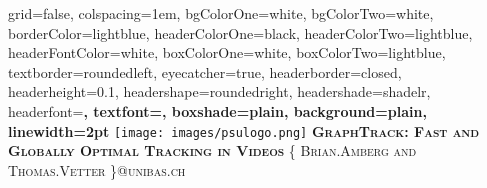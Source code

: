\documentclass[landscape,final,a0paper,fontscale=0.285]{baposter}
\begin{document}



\begin{poster}%
  {
  grid=false,
  colspacing=1em,
  bgColorOne=white,
  bgColorTwo=white,
  borderColor=lightblue,
  headerColorOne=black,
  headerColorTwo=lightblue,
  headerFontColor=white,
  boxColorOne=white,
  boxColorTwo=lightblue,
  textborder=roundedleft,
  eyecatcher=true,
  headerborder=closed,
  headerheight=0.1\textheight,
  headershape=roundedright,
  headershade=shadelr,
  headerfont=\Large\bf\textsc, %
  textfont={\setlength{\parindent}{1.5em}},
  boxshade=plain,
  background=plain,
  linewidth=2pt
  }
  {\texttt{[image: images/psulogo.png]}} 
  {\bf\textsc{GraphTrack: Fast and Globally Optimal Tracking in Videos}\vspace{0.5em}}
  {\textsc{\{ Brian.Amberg and Thomas.Vetter \}@unibas.ch}}
  {%
  }

    \newcommand{\colouredcircle}{%
      \tikz{\useasboundingbox (-0.2em,-0.32em) rectangle(0.2em,0.32em); \draw[draw=black,fill=lightblue,line width=0.03em] (0,0) circle(0.18em);}}


\end{poster}
\end{document}
